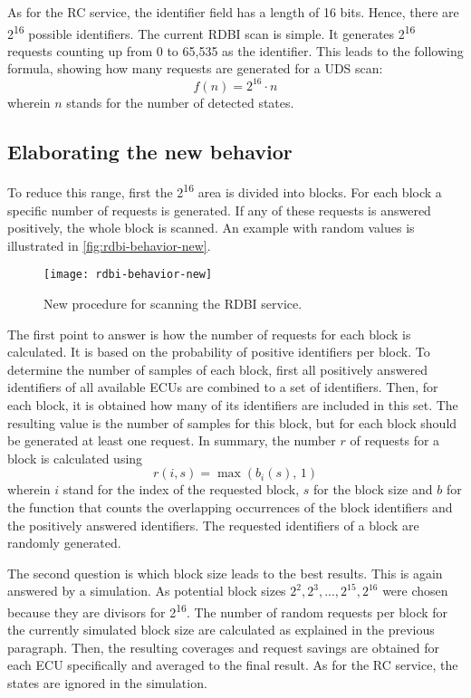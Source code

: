 As for the RC service, the identifier field has a length of 16 bits. Hence, there are 2\textsuperscript{16} possible identifiers.
The current RDBI scan is simple. It generates 2\textsuperscript{16} requests counting up from 0 to 65,535 as the identifier. This leads to the following formula, showing how many requests are generated for a UDS scan:
\[f(n)=2^{16} \cdot n\]
wherein $n$ stands for the number of detected states. 

\subsection{Elaborating the new behavior}
\label{subsubsec:rdbi-behavior}

To reduce this range, first the 2\textsuperscript{16} area is divided into blocks. For each block a specific number of requests is generated. If any of these requests is answered positively, the whole block is scanned. An example with random values is illustrated in \autoref{fig:rdbi-behavior-new}.

\begin{figure}[htb]
    \centering
    \texttt{[image: rdbi-behavior-new]}
    \caption{New procedure for scanning the RDBI service.}
    \label{fig:rdbi-behavior-new}
\end{figure}

The first point to answer is how the number of requests for each block is calculated. It is based on the probability of positive identifiers per block. To determine the number of samples of each block, first all positively answered identifiers of all available ECUs are combined to a set of identifiers. Then, for each block, it is obtained how many of its identifiers are included in this set. The resulting value is the number of samples for this block, but for each block should be generated at least one request. In summary, the number $r$ of requests for a block is calculated using
\[r(i, s)=\max(b_i(s), \,1)\]
wherein $i$ stand for the index of the requested block, $s$ for the block size and $b$ for the function that counts the overlapping occurrences of the block identifiers and the positively answered identifiers. The requested identifiers of a block are randomly generated.

The second question is which block size leads to the best results. This is again answered by a simulation. As potential block sizes $2^2, 2^3, ..., 2^{15}, 2^{16}$ were chosen because they are divisors for 2\textsuperscript{16}. The number of random requests per block for the currently simulated block size are calculated as explained in the previous paragraph. Then, the resulting coverages and request savings are obtained for each ECU specifically and averaged to the final result. As for the RC service, the states are ignored in the simulation.

